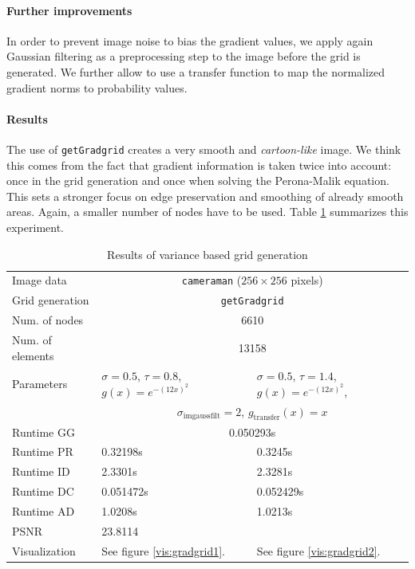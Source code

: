 \documentclass{report}
\begin{document}
\paragraph{Further improvements}

In order to prevent image noise to bias the gradient values, we apply again Gaussian filtering as a preprocessing step to the image before the grid is generated. We further allow to use a transfer function to map the normalized gradient norms to probability values.

\paragraph{Results}

The use of \texttt{getGradgrid} creates a very smooth and \emph{cartoon-like} image. We think this comes from the fact that gradient information is taken twice into account: once in the grid generation and once when solving the Perona-Malik equation. This sets a stronger focus on edge preservation and smoothing of already smooth areas. Again, a smaller number of nodes have to be used. Table \ref{res:gradgrid} summarizes this experiment.

\begin{table}[h]
	\centering
	\begin{tabular}{|lll}
		Image data & \multicolumn{2}{c}{\texttt{cameraman} ($256 \times 256$ pixels)} \\
		Grid generation & \multicolumn{2}{c}{\texttt{getGradgrid}} \\
		Num. of nodes & \multicolumn{2}{c}{6610} \\
		Num. of elements & \multicolumn{2}{c}{13158} \\
		Parameters & $\sigma=0.5$, $\tau=0.8$, $g(x) = e^{-(12 x)^2}$ & $\sigma=0.5$, $\tau=1.4$, $g(x) = e^{-(12 x)^2}$, \\
		& \multicolumn{2}{c}{$\sigma_\text{imgaussfilt}=2$, $g_\text{transfer}(x) = x$}\\
		Runtime GG & \multicolumn{2}{c}{0.050293s} \\
		Runtime PR & 0.32198s & 0.3245s \\
		Runtime ID & 2.3301s & 2.3281s\\
		Runtime DC & 0.051472s & 0.052429s \\
		Runtime AD & 1.0208s & 1.0213s \\
		PSNR & 23.8114 \\
		Visualization & See figure \ref{vis:gradgrid1}. & See figure \ref{vis:gradgrid2}. \\
	\end{tabular}
	\caption{Results of variance based grid generation}
	\label{res:gradgrid}
\end{table}
\end{document}
